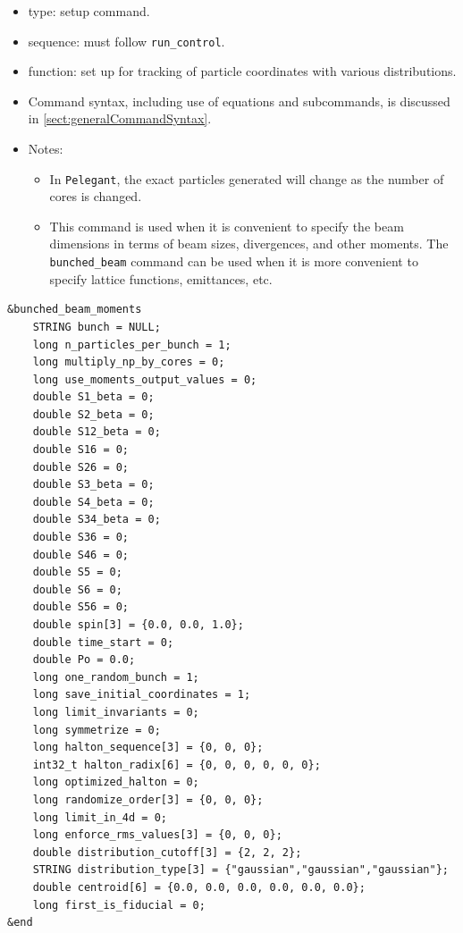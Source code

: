 \documentclass[11pt]{article}
\begin{document}
\begin{itemize}
\item type: setup command.
\item sequence: must follow \verb|run_control|.
\item function: set up for tracking of particle coordinates with various distributions.
\item Command syntax, including use of equations and subcommands, is discussed in \ref{sect:generalCommandSyntax}.
\item Notes:
  \begin{itemize}
  \item In \verb|Pelegant|, the exact particles generated will change as the number of cores is changed.
  \item This command is used when it is convenient to specify the beam dimensions in terms of beam sizes, divergences,
    and other moments. 
    The \verb|bunched_beam| command can be used when it is more convenient to specify lattice functions, emittances, etc.
  \end{itemize}
\end{itemize}

\begin{verbatim}
&bunched_beam_moments
    STRING bunch = NULL;
    long n_particles_per_bunch = 1;
    long multiply_np_by_cores = 0;
    long use_moments_output_values = 0;
    double S1_beta = 0;
    double S2_beta = 0;
    double S12_beta = 0;
    double S16 = 0;
    double S26 = 0;
    double S3_beta = 0;
    double S4_beta = 0;
    double S34_beta = 0;
    double S36 = 0;
    double S46 = 0;
    double S5 = 0;
    double S6 = 0;
    double S56 = 0;
    double spin[3] = {0.0, 0.0, 1.0};
    double time_start = 0;
    double Po = 0.0;
    long one_random_bunch = 1;
    long save_initial_coordinates = 1;
    long limit_invariants = 0;
    long symmetrize = 0;
    long halton_sequence[3] = {0, 0, 0};
    int32_t halton_radix[6] = {0, 0, 0, 0, 0, 0};
    long optimized_halton = 0;
    long randomize_order[3] = {0, 0, 0};
    long limit_in_4d = 0;
    long enforce_rms_values[3] = {0, 0, 0};
    double distribution_cutoff[3] = {2, 2, 2};
    STRING distribution_type[3] = {"gaussian","gaussian","gaussian"};
    double centroid[6] = {0.0, 0.0, 0.0, 0.0, 0.0, 0.0};
    long first_is_fiducial = 0;
&end
\end{verbatim}
\end{document}
